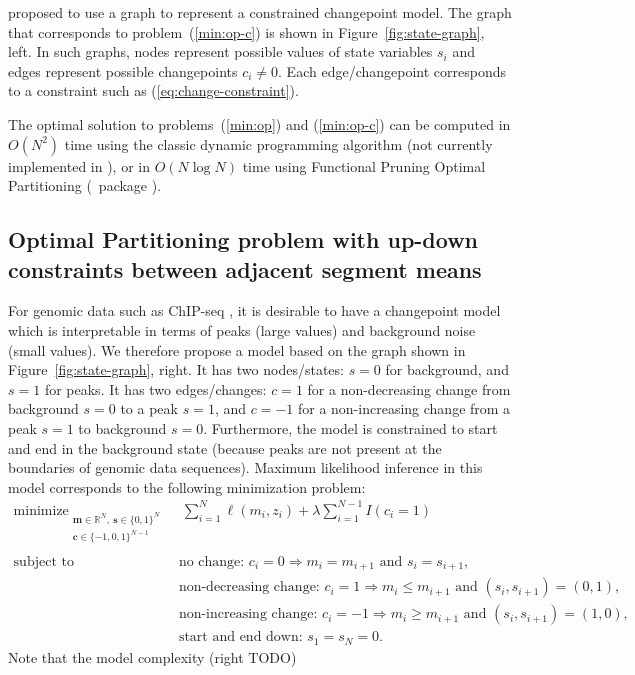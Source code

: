 \documentclass[article]{jss}
\newcommand{\R}{\proglang{R}}
\DeclareMathOperator*{\minimize}{minimize}
\newcommand{\RR}{\mathbb R}
\begin{document}
\citet{Hocking-constrained-changepoint-detection} proposed to use a
graph to represent a constrained changepoint model. The graph that
corresponds to problem~(\ref{min:op-c}) is shown in
Figure~\ref{fig:state-graph}, left. In such graphs, nodes represent
possible values of state variables $s_i$ and edges represent possible
changepoints $c_i\neq 0$. Each edge/changepoint corresponds to a
constraint such as (\ref{eq:change-constraint}).

The optimal solution to problems~(\ref{min:op}) and (\ref{min:op-c})
can be computed in $O(N^2)$ time using the classic dynamic programming
algorithm (not currently implemented in \R), or in $O(N\log N)$ time
using Functional Pruning Optimal Partitioning (\R\ package
).

\subsection{Optimal Partitioning problem with up-down constraints between
  adjacent segment means}

For genomic data such as ChIP-seq \citep{chip-seq}, it is desirable to
have a changepoint model which is interpretable in terms of peaks
(large values) and background noise (small values). We therefore
propose a model based on the graph shown in
Figure~\ref{fig:state-graph}, right. It has two nodes/states: $s=0$
for background, and $s=1$ for peaks. It has two edges/changes: $c=1$
for a non-decreasing change from background $s=0$ to a peak $s=1$, and
$c=-1$ for a non-increasing change from a peak $s=1$ to background
$s=0$. Furthermore, the model is constrained to start and end in the
background state (because peaks are not present at the boundaries of
genomic data sequences). Maximum likelihood inference in
this model corresponds to the following minimization problem:
\begin{align}
  \label{min:op-up-down}
  \minimize_{
  \substack{
  \mathbf m\in\RR^N,\ \mathbf s\in\{0, 1\}^N\\
  \mathbf c\in\{-1, 0,1\}^{N-1}\\
  }
  } &\ \ 
      \sum_{i=1}^N \ell(m_i, z_i) + \lambda \sum_{i=1}^{N-1} I(c_i = 1) \\
  \text{subject to\ \ } &\ \text{no change: }c_i = 0 \Rightarrow m_i = m_{i+1}\text{ and }s_i=s_{i+1}, \nonumber\\
    &\ \text{non-decreasing change: }c_i = 1 \Rightarrow m_i \leq m_{i+1}\text{ and }(s_i,s_{i+1})=(0,1),\nonumber\\
    &\ \text{non-increasing change: } c_i = -1 \Rightarrow m_i \geq m_{i+1}\text{ and }(s_i,s_{i+1})=(1,0),\nonumber\\
  & \ \text{start and end down: } s_1=s_N=0.\nonumber
\end{align}
Note that the model complexity (right TODO)
\end{document}

